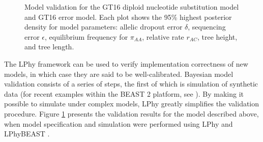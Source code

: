\documentclass[10pt,letterpaper,table]{article}
\begin{document}
\begin{figure}[!h]
    \caption{Model validation for the GT16 diploid nucleotide substitution model and GT16 error model. Each plot shows the 95\% highest posterior density for model parameters: allelic dropout error $\delta$, sequencing error $\epsilon$, equilibrium frequency for $\pi_{AA}$, relative rate $r_{AC}$, tree height, and tree length. }
    \label{fig_validation}
\end{figure}

\noindent The LPhy framework can be used to verify implementation correctness of new models, in which case they are said to be well-calibrated.
Bayesian model validation consists of a series of steps, the first of which is simulation of synthetic data (for recent examples within the BEAST 2 platform, see \cite{gaboriau20,chen2022accounting}). 
By making it possible to simulate under complex models, LPhy greatly simplifies the validation procedure.
Figure \ref{fig_validation} presents the validation results for the model described above, when model specification and simulation were performed using LPhy and LPhyBEAST \cite{chen2022accounting}.


\end{document}
